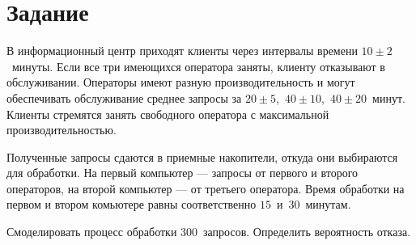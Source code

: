 \chapter{Задание}

В информационный центр приходят клиенты через интервалы времени $10\pm2$~минуты.
Если все три имеющихся оператора заняты, клиенту отказывают в обслуживании.
Операторы имеют разную производительность и могут обеспечивать обслуживание
среднее запросы за $20\pm5$,~$40\pm10$,~$40\pm20$~минут. Клиенты стремятся
занять свободного оператора с максимальной производительностью.

Полученные запросы сдаются в приемные накопители, откуда они выбираются для
обработки. На первый компьютер --- запросы от первого и второго операторов, на
второй компьютер --- от третьего оператора. Время обработки на первом и втором
комьютере равны соответственно $15$~и~$30$~минутам.

Смоделировать процесс обработки $300$~запросов. Определить вероятность отказа.

